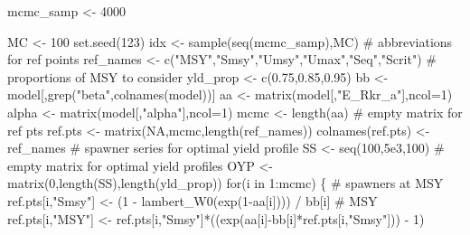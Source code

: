 \documentclass[
  11pt,
]{article}
\newenvironment{Shaded}{}{}
\newcommand{\CommentTok}[1]{\textcolor[rgb]{0.00,0.50,0.00}{#1}}
\newcommand{\ControlFlowTok}[1]{\textcolor[rgb]{0.00,0.00,1.00}{#1}}
\newcommand{\DataTypeTok}[1]{#1}
\newcommand{\DecValTok}[1]{#1}
\newcommand{\FloatTok}[1]{#1}
\newcommand{\KeywordTok}[1]{\textcolor[rgb]{0.00,0.00,1.00}{#1}}
\newcommand{\NormalTok}[1]{#1}
\newcommand{\OperatorTok}[1]{#1}
\newcommand{\OtherTok}[1]{\textcolor[rgb]{1.00,0.25,0.00}{#1}}
\newcommand{\StringTok}[1]{\textcolor[rgb]{0.00,0.50,0.50}{#1}}
\begin{document}
\begin{Shaded}
\begin{Highlighting}[]
\NormalTok{mcmc_samp <-}\StringTok{ }\DecValTok{4000}

\NormalTok{MC <-}\StringTok{ }\DecValTok{100}
\KeywordTok{set.seed}\NormalTok{(}\DecValTok{123}\NormalTok{)}
\NormalTok{idx <-}\StringTok{ }\KeywordTok{sample}\NormalTok{(}\KeywordTok{seq}\NormalTok{(mcmc_samp),MC)}
\CommentTok{# abbreviations for ref points}
\NormalTok{ref_names <-}\StringTok{ }\KeywordTok{c}\NormalTok{(}\StringTok{"MSY"}\NormalTok{,}\StringTok{"Smsy"}\NormalTok{,}\StringTok{"Umsy"}\NormalTok{,}\StringTok{"Umax"}\NormalTok{,}\StringTok{"Seq"}\NormalTok{,}\StringTok{"Scrit"}\NormalTok{)}
\CommentTok{# proportions of MSY to consider}
\NormalTok{yld_prop <-}\StringTok{ }\KeywordTok{c}\NormalTok{(}\FloatTok{0.75}\NormalTok{,}\FloatTok{0.85}\NormalTok{,}\FloatTok{0.95}\NormalTok{)}
\NormalTok{bb <-}\StringTok{ }\NormalTok{model[,}\KeywordTok{grep}\NormalTok{(}\StringTok{"beta"}\NormalTok{,}\KeywordTok{colnames}\NormalTok{(model))]}
\NormalTok{aa <-}\StringTok{ }\KeywordTok{matrix}\NormalTok{(model[,}\StringTok{"E_Rkr_a"}\NormalTok{],}\DataTypeTok{ncol=}\DecValTok{1}\NormalTok{)}
\NormalTok{alpha <-}\StringTok{ }\KeywordTok{matrix}\NormalTok{(model[,}\StringTok{"alpha"}\NormalTok{],}\DataTypeTok{ncol=}\DecValTok{1}\NormalTok{)}
\NormalTok{mcmc <-}\StringTok{ }\KeywordTok{length}\NormalTok{(aa)}
\CommentTok{# empty matrix for ref pts}
\NormalTok{ref.pts <-}\StringTok{ }\KeywordTok{matrix}\NormalTok{(}\OtherTok{NA}\NormalTok{,mcmc,}\KeywordTok{length}\NormalTok{(ref_names))}
\KeywordTok{colnames}\NormalTok{(ref.pts) <-}\StringTok{ }\NormalTok{ref_names}
\CommentTok{# spawner series for optimal yield profile}
\NormalTok{SS <-}\StringTok{ }\KeywordTok{seq}\NormalTok{(}\DecValTok{100}\NormalTok{,}\FloatTok{5e3}\NormalTok{,}\DecValTok{100}\NormalTok{)}
\CommentTok{# empty matrix for optimal yield profiles}
\NormalTok{OYP <-}\StringTok{ }\KeywordTok{matrix}\NormalTok{(}\DecValTok{0}\NormalTok{,}\KeywordTok{length}\NormalTok{(SS),}\KeywordTok{length}\NormalTok{(yld_prop))}
\ControlFlowTok{for}\NormalTok{(i }\ControlFlowTok{in} \DecValTok{1}\OperatorTok{:}\NormalTok{mcmc) \{}
  \CommentTok{# spawners at MSY}
\NormalTok{  ref.pts[i,}\StringTok{"Smsy"}\NormalTok{] <-}\StringTok{ }\NormalTok{(}\DecValTok{1} \OperatorTok{-}\StringTok{ }\KeywordTok{lambert_W0}\NormalTok{(}\KeywordTok{exp}\NormalTok{(}\DecValTok{1}\OperatorTok{-}\NormalTok{aa[i]))) }\OperatorTok{/}\StringTok{ }\NormalTok{bb[i]}
  \CommentTok{# MSY}
\NormalTok{  ref.pts[i,}\StringTok{"MSY"}\NormalTok{] <-}\StringTok{ }\NormalTok{ref.pts[i,}\StringTok{"Smsy"}\NormalTok{]}\OperatorTok{*}\NormalTok{((}\KeywordTok{exp}\NormalTok{(aa[i]}\OperatorTok{-}\NormalTok{bb[i]}\OperatorTok{*}\NormalTok{ref.pts[i,}\StringTok{"Smsy"}\NormalTok{])) }\OperatorTok{-}\StringTok{ }\DecValTok{1}\NormalTok{)}

\end{Highlighting}
\end{Shaded}
\end{document}
